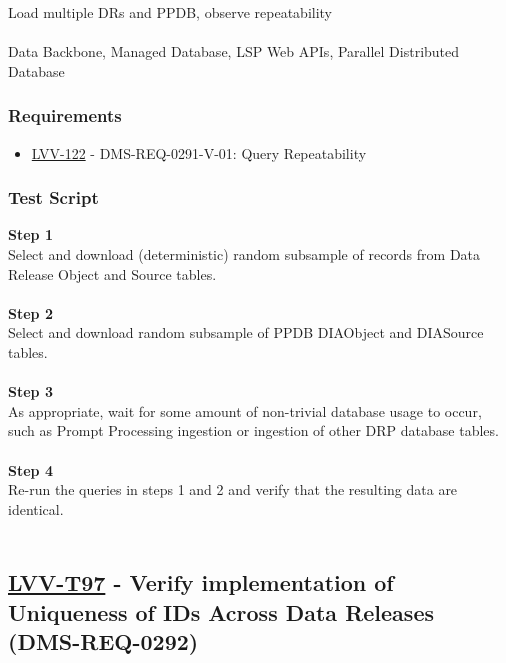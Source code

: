 Load multiple DRs and PPDB, observe repeatability\\
~\\
Data Backbone, Managed Database, LSP Web APIs, Parallel Distributed
Database

\hypertarget{requirements-73}{%
\subsubsection{Requirements}\label{requirements-73}}

\begin{itemize}
\tightlist
\item
  \href{https://jira.lsstcorp.org/browse/LVV-122}{LVV-122} -
  DMS-REQ-0291-V-01: Query Repeatability
\end{itemize}

\hypertarget{test-script-73}{%
\subsubsection{Test Script}\label{test-script-73}}

\textbf{Step 1}\\
Select and download (deterministic) random subsample of records from
Data Release Object and Source tables.\\
~\\
\textbf{Step 2}\\
Select and download random subsample of PPDB DIAObject and DIASource
tables.\\
~\\
\textbf{Step 3}\\
As appropriate, wait for some amount of non-trivial database usage to
occur, such as Prompt Processing ingestion or ingestion of other DRP
database tables.\\
~\\
\textbf{Step 4}\\
Re-run the queries in steps 1 and 2 and verify that the resulting data
are identical.\\
~\\

\hypertarget{lvv-t97---verify-implementation-of-uniqueness-of-ids-across-data-releases-dms-req-0292}{%
\subsection{\texorpdfstring{\href{https://jira.lsstcorp.org/secure/Tests.jspa\#/testCase/LVV-T97}{LVV-T97}
- Verify implementation of Uniqueness of IDs Across Data Releases
(DMS-REQ-0292)}{LVV-T97 - Verify implementation of Uniqueness of IDs Across Data Releases (DMS-REQ-0292)}}\label{lvv-t97---verify-implementation-of-uniqueness-of-ids-across-data-releases-dms-req-0292}}

